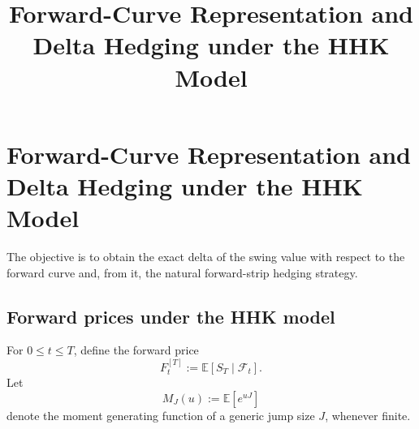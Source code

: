 \documentclass[10pt,a4paper,reqno]{amsart}
\newcommand{\<}{\langle}
\renewcommand{\>}{\rangle}
\theoremstyle{example}
\begin{document}
\title[Forward-Curve Representation and Delta Hedging under the HHK Model]{Forward-Curve Representation and Delta Hedging under the HHK Model}



\address{\today{}, Korteweg-de Vries Institute for Mathematics and Informatics
  Institute at the University of Amsterdam, Science Park
, 1098 XH, Amsterdam.}      

\maketitle
\vspace{-3mm}

\section{Forward-Curve Representation and Delta Hedging under the HHK Model}
\label{sec:hedging_hhk}


The objective is to
obtain the exact delta of the swing value with respect to the forward curve and, from it, the natural
forward-strip hedging strategy.

\subsection{Forward prices under the HHK model}

For $0 \le t \le T$, define the forward price
\[
F_t^{[T]} := \mathbb{E}\!\left[S_T \mid \mathcal{F}_t\right].
\]
Let
\[
M_J(u) := \mathbb{E}\!\left[e^{uJ}\right]
\]
denote the moment generating function of a generic jump size $J$, whenever finite.
\end{document}
